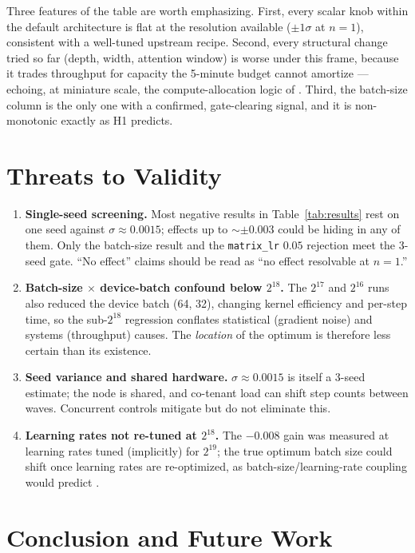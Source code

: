 \documentclass{article}
\begin{document}
Three features of the table are worth emphasizing. First, every scalar knob within the default architecture is flat at the resolution available ($\pm 1\sigma$ at $n{=}1$), consistent with a well-tuned upstream recipe. Second, every structural change tried so far (depth, width, attention window) is worse under this frame, because it trades throughput for capacity the 5-minute budget cannot amortize --- echoing, at miniature scale, the compute-allocation logic of \citet{hoffmann2022chinchilla}. Third, the batch-size column is the only one with a confirmed, gate-clearing signal, and it is non-monotonic exactly as H1 predicts.

\section{Threats to Validity}
\label{sec:threats}

\begin{enumerate}
    \item \textbf{Single-seed screening.} Most negative results in Table~\ref{tab:results} rest on one seed against $\sigma \approx 0.0015$; effects up to $\sim \pm 0.003$ could be hiding in any of them. Only the batch-size result and the \texttt{matrix\_lr} $0.05$ rejection meet the 3-seed gate. ``No effect'' claims should be read as ``no effect resolvable at $n = 1$.''
    \item \textbf{Batch-size $\times$ device-batch confound below $2^{18}$.} The $2^{17}$ and $2^{16}$ runs also reduced the device batch (64, 32), changing kernel efficiency and per-step time, so the sub-$2^{18}$ regression conflates statistical (gradient noise) and systems (throughput) causes. The \emph{location} of the optimum is therefore less certain than its existence.
    \item \textbf{Seed variance and shared hardware.} $\sigma \approx 0.0015$ is itself a 3-seed estimate; the node is shared, and co-tenant load can shift step counts between waves. Concurrent controls mitigate but do not eliminate this.
    \item \textbf{Learning rates not re-tuned at $2^{18}$.} The $-0.008$ gain was measured at learning rates tuned (implicitly) for $2^{19}$; the true optimum batch size could shift once learning rates are re-optimized, as batch-size/learning-rate coupling would predict \cite{mccandlish2018empirical}.
\end{enumerate}

\section{Conclusion and Future Work}
\label{sec:conclusion}
\end{document}
